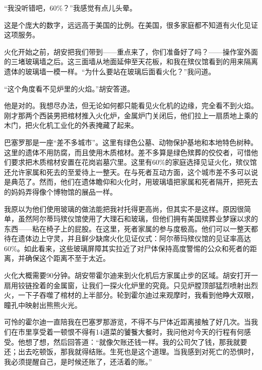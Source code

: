 \documentclass[12pt,oneside]{book}
\begin{document}
\begin{bookref}[frametitle={\cite{好好告别：世界葬礼观察手记}}]
“我没听错吧，60\%？”我感觉有点儿头晕。

这是个庞大的数字，远远高于美国的比例。在美国，很多家庭都不知道有火化见证这项服务。

火化开始之前，胡安把我们带到——重点来了，你们准备好了吗？——操作室外面的三堵玻璃墙之后。这三面墙从地面延伸至天花板，和我在殡仪馆看到的用来隔离遗体的玻璃墙一模一样。“为什么要站在玻璃后面看火化？”我问道。

“这个角度看不见炉里的火焰。”胡安答道。

他是对的。我想尽办法，但无论如何都只能看见火化机的边缘，完全看不到火焰。刚才那两个西装男把棺材推入火化炉，金属炉门关闭后，他们拉上一扇质地上乘的木门，把火化机工业化的外表掩藏了起来。

巴塞罗那是一座“差不多城市”。这里有绿色公墓、动物保护基地和本地特色树种。这里的遗体不用防腐，而且使用木质棺材。差不多算是绿色殡葬的佼佼者，可惜他们要求把木质棺材安置在花岗岩墓穴里。这里有60\%的家庭选择见证火化，殡仪馆还允许家属和死去的至爱待上一整天。在与死者互动方面，这个城市差不多可以说是典范了。然而，他们在遗体瞻仰和火化时，用玻璃墙把家属和死者隔开，把死去的妈妈弄得像个博物馆的展品一样。

我原以为他们使用玻璃的做法能把我衬托得更高尚，但其实不是这样。原因很简单，虽然阿尔蒂玛殡仪馆使用了大理石和玻璃，但他们拥有美国殡葬业梦寐以求的东西——粘在椅子上的屁股。在这里，死者家属的参与度极高。他们可以一整天都待在遗体边上守灵，并且鲜少缺席火化见证仪式：阿尔蒂玛殡仪馆的见证率高达60\%。如此看来，这些玻璃屏障其实拉近了对尸体保持高度警惕的公众和死者的距离，并确保这个距离不至于太近。

火化大概需要90分钟。胡安带霍尔迪来到火化机后方家属止步的区域。胡安打开一扇用铰链拴着的金属窗，让我们一探火化炉里的究竟。只见炉膛顶部猛烈喷射出烈火，一下子吞噬了棺材的上半部分。轮到霍尔迪过来观摩时，我看到他睁大双眼，瞳孔中映射出熊熊火光。

可怜的霍尔迪一直陪我在巴塞罗那游览，不得不与尸体近距离接触了好几次。当我们在市里享受着一顿恨不得有14道菜的饕餮大餐时，我问他对今天的行程有何感受。他想了想，然后回答道：“就像欠账还钱一样。我的公司欠了钱，那我就要还；出去吃顿饭，那我就得结账。生死也是这个道理。当我感到对死亡的恐惧时，我必须提醒自己，是时候还账了，还活着的账。”

\end{bookref}
\end{document}
